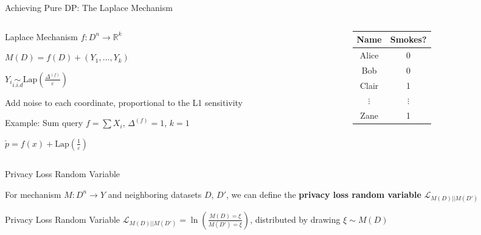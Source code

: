\documentclass[12pt,aspectratio=169]{beamer}
\begin{document}
\begin{frame}{Achieving Pure DP: The Laplace Mechanism}

\begin{columns}[c]

\begin{column}{.5\textwidth}

\begin{block}{Laplace Mechanism}
$f: D^n \rightarrow \mathbb{R}^k$

$M(D) = f(D) + (Y_1, \dots, Y_k)$

$Y_i \underset{i.i.d}{\sim} \text{Lap}(\frac{\Delta^{(f)}}{\varepsilon})$
\end{block}

Add noise to each coordinate, proportional to the L1 sensitivity

\begin{block}{Example: Sum query}
$f = \sum X_i$, $\Delta^{(f)} = 1$, $k=1$

$\tilde{p} = f(x) + \text{Lap}(\frac{1}{\varepsilon})$
\end{block}

\end{column}

\begin{column}{.5\textwidth}

\begin{table}[]
    \centering
    \begin{tabular}{c|c}
    Name    &   Smokes?\\
    \hline
    Alice     &  0\\
    Bob     & 0\\
    Clair     & 1\\
    $\vdots$    & $\vdots$\\
    Zane    &   1\\
    \end{tabular}
\end{table}

\end{column}
\end{columns}

\end{frame}

\begin{frame}{Privacy Loss Random Variable}

For mechanism $M: D^n \rightarrow Y$ and neighboring datasets $D$, $D'$, we can define the \textbf{privacy loss random variable} $\mathcal{L}_{M(D) || M(D')}$

\vspace{5mm}

\begin{block}{Privacy Loss Random Variable}
  $\mathcal{L}_{M(D)||M(D')} = \ln (\frac{M(D) = \xi}{M(D') = \xi})$, distributed by drawing $\xi \sim M(D)$
\end{block}

\end{frame}
\end{document}
